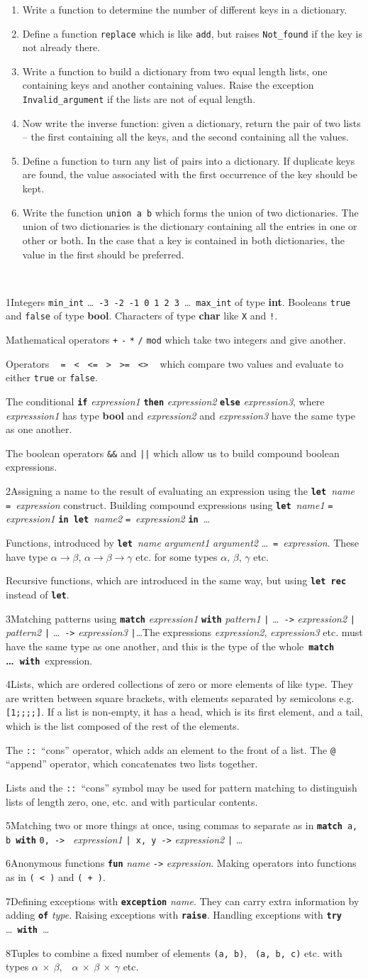 \documentclass[]{book}
\makeatletter
\newcommand\upquote[1]{\textquotesingle#1\textquotesingle}
\newcommand{\sofarstartingoff}{

\noindent \lettrine[loversize=0.1,nindent=0em]{1}{}Integers \texttt{min\_int} \ldots\ \texttt{-3}\ \texttt{-2}\ \texttt{-1}\ \texttt{0}\ \texttt{1}\ \texttt{2}\ \texttt{3}\ \ldots\ \texttt{max\_int} of type \textbf{\textsf{int}}. Booleans \texttt{true} and \texttt{false} of type \textbf{\textsf{bool}}. \noindent Characters of type \textsf{\textbf{char}} like \texttt{\upquote{X}} and \texttt{\upquote{!}}.
\vspace{2mm}

\noindent Mathematical operators \texttt{+} \texttt{-} \texttt{*} \texttt{/} \texttt{mod} which take two integers and give another.

\vspace{2mm}

\noindent Operators \ \!\! \texttt{=\ \!\!} \texttt{<\ \!\!} \texttt{<=\ \!\!} \texttt{>\ \!\!} \texttt{>=\ \!\!} \texttt{<>} \ \!\! which compare two values and evaluate to either \texttt{true} or \texttt{false}.

\vspace{2mm}

\noindent The conditional \textbf{\texttt{if}} \textit{expression1} \textbf{\texttt{then}} \textit{expression2} \textbf{\texttt{else}} \textit{expression3}, where \textit{expresssion1} has type \textsf{\textbf{bool}} and \textit{expression2} and \textit{expression3} have the same type as one another.

\vspace{2mm}

\noindent The boolean operators \texttt{\&\&} and \texttt{||} which allow us to build compound boolean expressions.}
\newcommand{\sofarfunctions}
{
\noindent\lettrine[loversize=0.1,findent=2pt,nindent=0em]{2}{}Assigning a name to the result of evaluating an expression using the \textbf{\texttt{let}}\ \textit{name} \texttt{=}\ \textit{expression} construct. Building compound expressions using \textbf{\texttt{let}}\ \textit{name1} \texttt{=} \textit{expression1} \textbf{\texttt{in}}\ \textbf{\texttt{let}}\ \textit{name2} \texttt{=}\ \textit{expression2} \textbf{\texttt{in}}\ \ldots

\vspace{2mm} 

\noindent Functions, introduced by \textbf{\texttt{let}}\ \textit{name} \textit{argument1} \textit{argument2} \ldots\ \texttt{=}\ \textit{expression}. These have type $\alpha \rightarrow \beta$, $\alpha \rightarrow \beta \rightarrow \gamma$ etc. for some types $\alpha$, $\beta$, $\gamma$ etc.

\vspace{2mm}

\noindent Recursive functions, which are introduced in the same way, but using \textbf{\texttt{let\!\! rec}} instead of \textbf{\texttt{let}}.}
\newcommand{\sofarcasebycase}
{\noindent \lettrine[loversize=0.1,findent=2pt,nindent=0em]{3}{}Matching patterns using \textbf{\texttt{match}} \textit{expression1} \textbf{\texttt{with}} \textit{pattern1} \texttt{|} \ldots\ \texttt{->} \textit{expression2} \texttt{|} \textit{pattern2} \texttt{|} \ldots\ \texttt{->} \textit{expression3} \texttt{|}\ldots The expressions \textit{expression2}, \textit{expression3} etc. must have the same type as one another, and this is the type of the whole \,\textbf{\texttt{match} \ldots\ \texttt{with}}\, expression.}
\newcommand{\sofarlistingthings}
{
\noindent \lettrine[loversize=0.1,findent=2pt,nindent=0em]{4}{}Lists, which are ordered collections of zero or more elements of like type. They are written between square brackets, with elements separated by semicolons e.g. \texttt{[1;\! 2;\! 3;\! 4;\! 5]}. If a list is non-empty, it has a head, which is its first element, and a tail, which is the list composed of the rest of the elements.

\vspace{2mm}

\noindent The \texttt{::}\ ``cons'' operator, which adds an element to the front of a list. The \texttt{@} ``append'' operator, which concatenates two lists together.

\vspace{2mm}

\noindent Lists and the \texttt{::}\ ``cons'' symbol may be used for pattern matching to distinguish lists of length zero, one, etc. and with particular contents.}
\newcommand{\sofarsortingthings}
{
\noindent \lettrine[loversize=0.1,findent=2pt,nindent=0em]{5}{}Matching two or more things at once, using commas to separate as in \texttt{\textbf{match}}\, \texttt{a,\!\! b}\, \textbf{\texttt{with}} \texttt{0,\!\! 0\! ->\! }\! \textit{expression1} \texttt{|\ \!x,\!\! y\! ->} \textit{expression2} \texttt{|} \ldots
}
\newcommand{\sofarfunctionsuponfunctions}
{
\noindent \lettrine[loversize=0.1,findent=2pt,nindent=0em]{6}{}Anonymous functions \textbf{\texttt{fun}} \textit{name} \texttt{->} \textit{expression}. Making operators into functions as in \texttt{(\! <\! )} and \texttt{(\! +\! )}.
}
\newcommand{\sofarwhenthingsgowrong}
{
\noindent \lettrine[loversize=0.1,findent=2pt,nindent=0em]{7}{}Defining exceptions with \textbf{\texttt{exception}} \textit{name}. They can carry extra information by adding \textbf{\texttt{of}} \textit{type}. Raising exceptions with \textbf{\texttt{raise}}. Handling exceptions with \textbf{\texttt{try}} \ldots\ \textbf{\texttt{with}}\ \ldots}
\newcommand{\sofarlookingthingsup}
{
\noindent \lettrine[loversize=0.1,findent=2pt,nindent=0em]{8}{}Tuples to combine a fixed number of elements \texttt{(a,\! b)},\!    \ \texttt{(a,\! b,\! c)} etc. with types \textsf{\textbf{$\alpha$ $\times$ $\beta$}},\ \  \textsf{\textbf{$\alpha$ $\times$ $\beta$ $\times$ $\gamma$}} etc.
}
\makeatother
\begin{document}
\begin{enumerate}
\item Write a function to determine the number of different keys in a dictionary.

\item Define a function \texttt{replace} which is like \texttt{add}, but raises \texttt{Not\_found} if the key is not already there.

\item Write a function to build a dictionary from two equal length lists, one containing keys and another containing values. Raise the exception \texttt{Invalid\_argument} if the lists are not of equal length.

\item Now write the inverse function: given a dictionary, return the pair of two lists -- the first containing all the keys, and the second containing all the values.

\item Define a function to turn any list of pairs into a dictionary. If duplicate keys are found, the value associated with the first occurrence of the key should be kept.

\item Write the function \texttt{union\! a\! b} which forms the union of two dictionaries. The union of two dictionaries is the dictionary containing all the entries in one or other or both. In the case that a key is contained in both dictionaries, the value in the first should be preferred. 

\end{enumerate}


\cleardoublepage
\thispagestyle{empty}
\\

\begin{multicols*}{2}
\footnotesize
\sofarstartingoff

\vspace{\baselineskip}
\sofarfunctions

\vspace{\baselineskip}
\sofarcasebycase

\vspace{\baselineskip}
\sofarlistingthings

\vspace{\baselineskip}
\sofarsortingthings

\vspace{\baselineskip}
\sofarfunctionsuponfunctions

\vspace{\baselineskip}
\sofarwhenthingsgowrong

\vspace{\baselineskip}
\sofarlookingthingsup

\end{multicols*}
\end{document}
